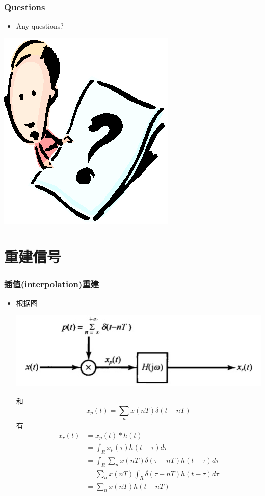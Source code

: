\documentclass[CJKutf8,xcolor=pdftex,dvipsnames,table]{beamer}
\begin{document}
\begin{CJK*}{UTF8}{song}
  \begin{frame}
    \frametitle{Questions}
    \begin{itemize}
    \item Any questions?
    \end{itemize}
    \begin{center}
      \includegraphics[scale=.5]{question}
    \end{center}
  \end{frame} 
  
  \section{重建信号}

  \begin{frame}
    \frametitle{插值(interpolation)重建}
    \begin{itemize}
    \item 根据图
	    \begin{center}
    	\includegraphics[scale=.3]{ss-c-f7-4a}
    	\end{center}
	和
    	\[
    	x_p(t)=\sum_n x(nT)\delta(t-nT)
    	\]
	有
    	\begin{align*}
        	x_r(t) & = x_p(t)*h(t) \\
			& = \int_R x_p(\tau)h(t-\tau)d\tau \\
			& = \int_R \sum_n x(nT)\delta(\tau-nT) h(t-\tau)d\tau \\
			& = \sum_n x(nT) \int_R \delta(\tau-nT) h(t-\tau)d\tau \\
			& = \sum_n x(nT) h(t-nT)
    	\end{align*}   
    \end{itemize}
  \end{frame} 


\end{CJK*}
\end{document}

